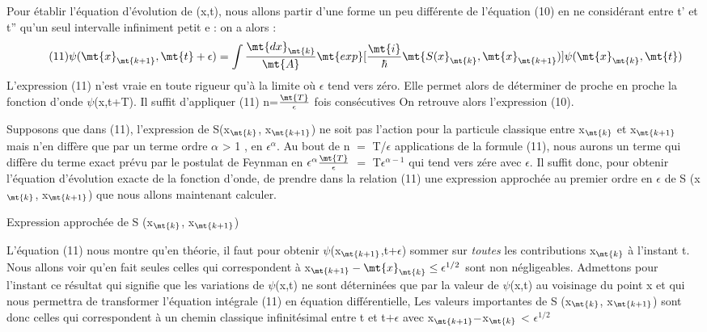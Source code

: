 Pour établir l'équation d'évolution de (x,t), nous allons
partir d'une forme un peu différente de l'équation (10) en ne considérant
entre t' et t'' qu'un seul intervalle infiniment petit e : on a alors :
\[
\tag{11}\psi(\mt{x}_\mt{k+1},\mt{t}+\epsilon) = \int \frac{\mt{dx}_\mt{k}}{\mt{A}}
\mt{ exp }[\frac{\mt{i}}{\hbar} \mt{ S ( x}_\mt{k}, \mt{x}_\mt{k+1} ) ]
\psi (\mt{x}_\mt{k}, \mt{t} )
\]
L'expression (11) n'est vraie en toute rigueur qu'à la limite où $\epsilon$ tend
vers zéro. Elle permet alors de déterminer de proche en proche la fonction
d'onde $\psi$(x,t+T). Il suffit d'appliquer (11) n=$\frac{\mt{T}}{\epsilon}$ fois consécutives
On retrouve alors l'expression (10).

Supposons que dans (11), l'expression de S(x$_\mt{k}$, x$_\mt{k+1}$) ne soit
pas l'action pour la particule classique entre x$_\mt{k}$ et x$_\mt{k+1}$ mais n'en diffère
que par un terme ordre $\alpha$ > 1 , en $\epsilon^\alpha$. Au bout de n $=$ T/$\epsilon$ applications
de la formule (11), nous aurons un terme qui diffère du terme exact prévu
par le postulat de Feynman en  $\epsilon^\alpha \frac{\mt{T}}{\epsilon}$  $=$  T$\epsilon^{\alpha-1}$ qui tend vers zére avec $\epsilon$. Il
suffit donc, pour obtenir l'équation d'évolution exacte de la fonction
d'onde, de prendre dans la relation (11) une expression approchée au premier
ordre en $\epsilon$ de S (x$_\mt{k}$, x$_\mt{k+1}$) que nous allons maintenant calculer.

Expression approchée de S (x$_\mt{k}$, x$_\mt{k+1}$)

\begin{center}
\end{center}
L'équation (11) nous montre qu'en théorie, il faut pour obtenir
$\psi$(x$_\mt{k+1}$,t+$\epsilon$)
sommer sur {\it toutes} les contributions x$_\mt{k}$ à l'instant t. Nous
allons voir qu'en fait seules celles qui correspondent à
x$_\mt{k+1} - \mt{x}_\mt{k} \leq \epsilon^{1/2}$
sont non négligeables. Admettons pour l'instant ce résultat qui signifie
que les variations de $\psi$(x,t) ne sont déterninées que par la valeur de
$\psi$(x,t) au voisinage du point x et qui nous permettra de transformer
l'équation intégrale (11) en équation différentielle, Les valeurs importantes
de S (x$_\mt{k}$, x$_\mt{k+1}$) sont donc celles qui correspondent à un chemin
classique infinitésimal entre t et t$+\epsilon$ avec x$_\mt{k+1} - $x$_\mt{k}$ < $\epsilon^{1/2}$

